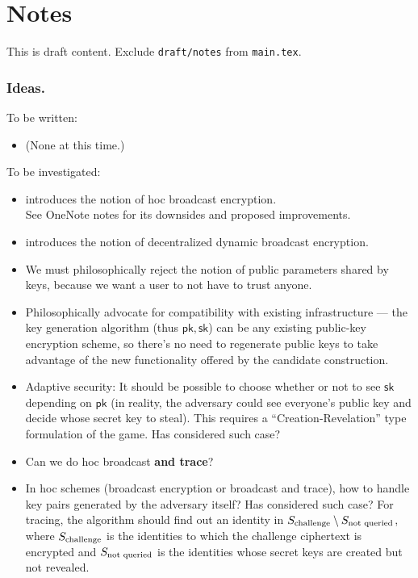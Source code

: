 \section{Notes}

\begingroup
\color{red}
This is draft content.
Exclude \texttt{draft/notes} from \texttt{main.tex}.
\endgroup

\subsubsection{Ideas.}
To be written:
\begin{itemize}
\item (None at this time.)
\end{itemize}
To be investigated:
\begin{itemize}
\item \cite{CCS:WQZD10} introduces the notion of \ad hoc broadcast encryption.\\
See OneNote notes for its downsides and proposed improvements.
\item \cite{SCN:PhaPoiStr12} introduces the notion of decentralized dynamic broadcast encryption.
\item We must philosophically reject the notion of public parameters shared by keys, because we want a user to not have to trust anyone.
\item Philosophically advocate for compatibility with existing infrastructure
--- the key generation algorithm (thus $\mathsf{pk},\mathsf{sk}$) can be any existing public-key encryption scheme, so there's no need to regenerate public keys to take advantage of the new functionality offered by the candidate construction.
\item Adaptive security: It should be possible to choose whether or not to see $\mathsf{sk}$ depending on $\mathsf{pk}$ (in reality, the adversary could see everyone's public key and decide whose secret key to steal). This requires a ``Creation-Revelation'' type formulation of the game.
Has \cite{CCS:WQZD10} considered such case?
\item Can we do \ad hoc broadcast \textbf{and trace}?
\item In \ad hoc schemes (broadcast encryption or broadcast and trace), how to handle key pairs generated by the adversary itself?
Has \cite{CCS:WQZD10} considered such case?
For tracing, the algorithm should find out an identity in ${S_{\textup{challenge}}}\setminus S_{\textup{not queried}}$, where $S_{\textup{challenge}}$ is the identities to which the challenge ciphertext is encrypted and $S_{\textup{not queried}}$ is the identities whose secret keys are created but not revealed.

\end{itemize}

